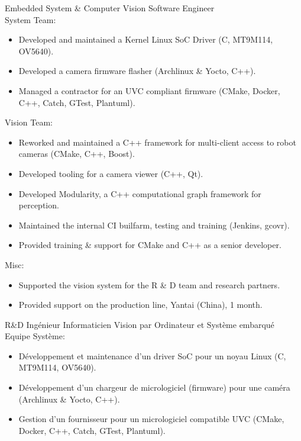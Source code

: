 \documentclass{article}
\begin{document}
\begin{llist}
 {
Embedded System \& Computer Vision Software Engineer \\
System Team:
\vspace{-0.50cm}
\begin{itemize}
	\item Developed and maintained a Kernel Linux SoC Driver (C, MT9M114, OV5640).
	\item Developed a camera firmware flasher (Archlinux \& Yocto, C++).
	\item Managed a contractor for an UVC compliant firmware (CMake, Docker, C++, Catch, GTest, Plantuml).
\end{itemize}
Vision Team:
\vspace{-0.50cm}
\begin{itemize}
	\item Reworked and maintained a C++ framework for multi-client access to robot cameras (CMake, C++, Boost).
	\item Developed tooling for a camera viewer (C++, Qt).
	\item Developed Modularity, a C++ computational graph framework for perception.
	\item Maintained the internal CI builfarm, testing and training (Jenkins,
		gcovr).
	\item Provided training \& support for CMake and C++ as a senior developer.
\end{itemize}
Misc:
\vspace{-0.50cm}
\begin{itemize}
	\item Supported the vision system for the R \& D team and research partners.
	\item Provided support on the production line, Yantai (China), 1 month.
\end{itemize}
} {
R\&D Ing\'{e}nieur Informaticien Vision par Ordinateur et Syst\`{e}me
embarqu\'{e} \\
Equipe Syst\`{e}me:
\vspace{-0.50cm}
\begin{itemize}
	\item D\'{e}veloppement et maintenance d'un driver SoC pour un noyau Linux (C, MT9M114, OV5640).
	\item D\'{e}veloppement d'un chargeur de micrologiciel (firmware) pour une cam\'{e}ra (Archlinux \& Yocto, C++).
	\item Gestion d'un fournisseur pour un micrologiciel compatible UVC (CMake, Docker, C++, Catch, GTest, Plantuml).

\end{itemize}}
\end{llist}
\end{document}
